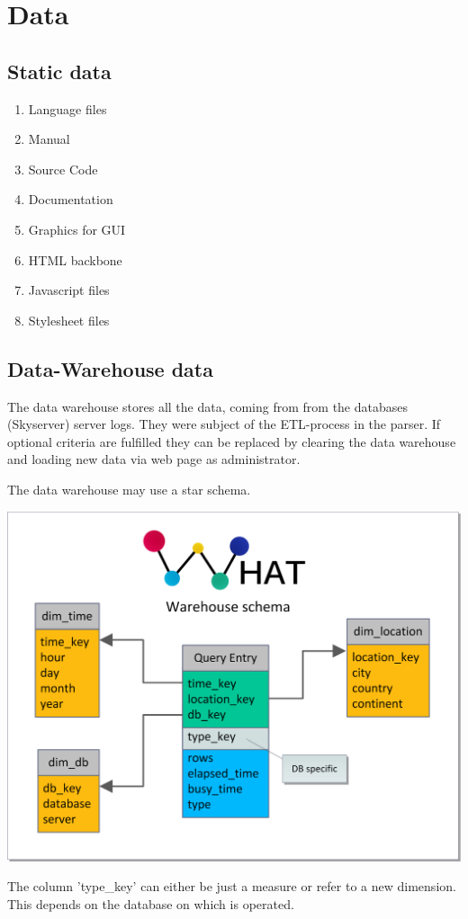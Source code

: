 \section{Data}
\renewcommand{\theenumi}{/D\arabic{enumi}0/}
\renewcommand{\labelenumi}{\theenumi}

\subsection{Static data}

\begin{enumerate}
  \item Language files
  \item Manual
  \item Source Code
  \item Documentation
  \item Graphics for GUI
  \item HTML backbone
  \item Javascript files
  \item Stylesheet files
\end{enumerate}



\newpage
\subsection{Data-Warehouse data} \label{WHschema}


The data warehouse stores all the data, coming from from the databases (Skyserver) server logs.
They were subject of the ETL-process in the parser. If optional criteria are fulfilled
 they can be replaced by clearing the data warehouse 
 and loading new data via web page as administrator.

The data warehouse may use a star schema.
\begin{center}
\includegraphics[width=1\linewidth]{Pictures/WareHouseSchema.png} 
\end{center}   
The column 'type\_key' can either be just a measure or refer to a new dimension. This depends on the database
on which is operated.  

